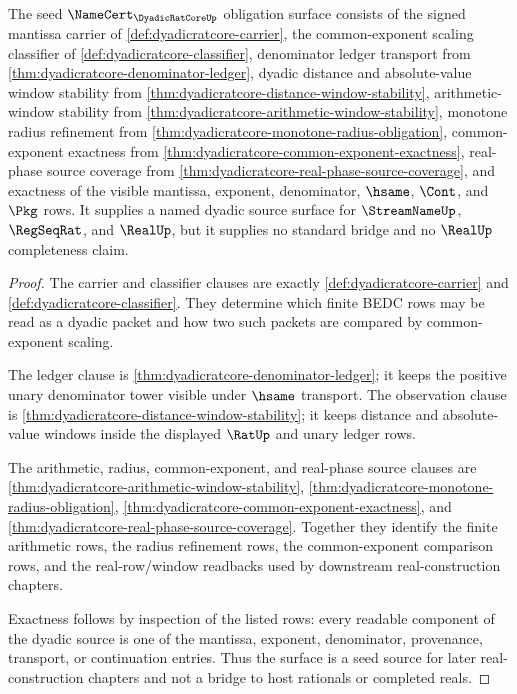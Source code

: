 \begin{theorem}
\label{thm:dyadicratcore-namecert-obligation-surface}
The seed $\NameCert_{\DyadicRatCoreUp}$ obligation surface consists of the
signed mantissa carrier of \autoref{def:dyadicratcore-carrier}, the
common-exponent scaling classifier of
\autoref{def:dyadicratcore-classifier}, denominator ledger transport from
\autoref{thm:dyadicratcore-denominator-ledger}, dyadic distance and
absolute-value window stability from
\autoref{thm:dyadicratcore-distance-window-stability}, arithmetic-window
stability from
\autoref{thm:dyadicratcore-arithmetic-window-stability}, monotone radius
refinement from
\autoref{thm:dyadicratcore-monotone-radius-obligation}, common-exponent
exactness from
\autoref{thm:dyadicratcore-common-exponent-exactness}, real-phase source
coverage from
\autoref{thm:dyadicratcore-real-phase-source-coverage}, and exactness of the
visible mantissa, exponent, denominator, $\hsame$, $\Cont$, and $\Pkg$ rows.
It supplies a named dyadic source surface for $\StreamNameUp$, $\RegSeqRat$,
and $\RealUp$, but it supplies no standard bridge and no $\RealUp$
completeness claim.
\end{theorem}
\begin{proof}
The carrier and classifier clauses are exactly
\autoref{def:dyadicratcore-carrier} and
\autoref{def:dyadicratcore-classifier}. They determine which finite BEDC rows
may be read as a dyadic packet and how two such packets are compared by
common-exponent scaling.

The ledger clause is
\autoref{thm:dyadicratcore-denominator-ledger}; it keeps the positive unary
denominator tower visible under $\hsame$ transport. The observation clause is
\autoref{thm:dyadicratcore-distance-window-stability}; it keeps distance and
absolute-value windows inside the displayed $\RatUp$ and unary ledger rows.

The arithmetic, radius, common-exponent, and real-phase source clauses are
\autoref{thm:dyadicratcore-arithmetic-window-stability},
\autoref{thm:dyadicratcore-monotone-radius-obligation},
\autoref{thm:dyadicratcore-common-exponent-exactness}, and
\autoref{thm:dyadicratcore-real-phase-source-coverage}. Together they identify
the finite arithmetic rows, the radius refinement rows, the common-exponent
comparison rows, and the real-row/window readbacks used by downstream
real-construction chapters.

Exactness follows by inspection of the listed rows: every readable component
of the dyadic source is one of the mantissa, exponent, denominator,
provenance, transport, or continuation entries. Thus the surface is a seed
source for later real-construction chapters and not a bridge to host rationals
or completed reals.
\end{proof}

